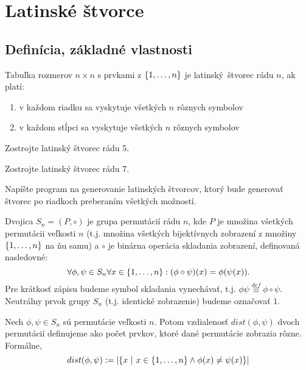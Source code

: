 \chapter{Latinské štvorce}

\section{Definícia, základné vlastnosti}

\begin{definition}
Tabuľka rozmerov $n\times n$ s prvkami z $\left\{1, \ldots, n\right\}$ je latinský~štvorec rádu $n$, ak platí:
\begin{enumerate}
    \item v každom riadku sa vyskytuje všetkých $n$ rôznych symbolov
    \item v každom stĺpci sa vyskytuje všetkých $n$ rôznych symbolov
\end{enumerate}
\end{definition}

\begin{exercise}
Zostrojte latinský štvorec rádu 5.
\end{exercise}

\begin{exercise}
Zostrojte latinský štvorec rádu 7.
\end{exercise}

\begin{exercise}
Napíšte program na generovanie latinských štvorcov, ktorý bude generovať štvorec po riadkoch preberaním všetkých možností.
\end{exercise}

\begin{definition}
Dvojica $S_n = (P, \circ)$ je grupa permutácií rádu $n$, kde $P$ je množina všetkých permutácii veľkosti $n$ (t.j. množina všetkých bijektívnych zobrazení z množiny $\left\{1, \ldots, n\right\}$ na ňu samu) a $\circ$ je binárna operácia skladania zobrazení, definovaná nasledovné: $$\forall\phi,\psi\in S_n  \forall x \in \left\{1, \ldots, n\right\}: (\phi \circ \psi)(x) = \phi(\psi(x)).$$ 
Pre krátkosť zápisu budeme symbol skladania vynechávať, t.j. $\phi \psi \overset{def}{\equiv} \phi \circ \psi$. 
Neutrálny prvok grupy $S_n$ (t.j. identické zobrazenie) budeme označovať $1$.
\end{definition}

\begin{definition}
\label{def:permdist}
Nech $\phi, \psi \in S_n$ sú permutácie veľkosti $n$. 
Potom vzdialenosť $dist(\phi, \psi)$ dvoch permutácií definujeme ako počet prvkov, ktoré dané permutácie zobrazia rôzne. 
Formálne, 
$$dist(\phi, \psi) := \left| \left\{x ~|~ x \in \left\{1, \ldots, n\right\} \wedge \phi(x) \neq \psi(x) \right\} \right| $$
\end{definition}

